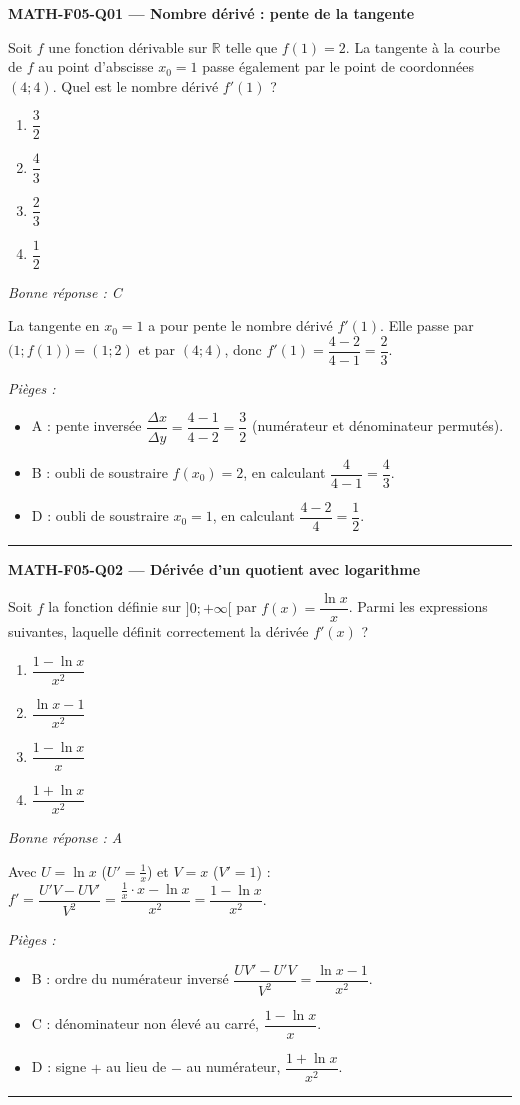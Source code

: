 \documentclass[11pt,a4paper]{article}
\newcommand{\R}{\mathbb{R}}\newcommand{\N}{\mathbb{N}}\newcommand{\Z}{\mathbb{Z}}
\begin{document}
\noindent\textbf{MATH-F05-Q01 --- Nombre dérivé : pente de la tangente}\par
Soit $f$ une fonction dérivable sur $\R$ telle que $f(1)=2$. La tangente à la courbe de $f$ au point d'abscisse $x_0=1$ passe également par le point de coordonnées $(4;4)$. Quel est le nombre dérivé $f'(1)$ ?
\begin{enumerate}[label=\Alph*)]
\item $\dfrac{3}{2}$
\item $\dfrac{4}{3}$
\item $\dfrac{2}{3}$
\item $\dfrac{1}{2}$
\end{enumerate}
\textit{Bonne réponse : C}\par
La tangente en $x_0=1$ a pour pente le nombre dérivé $f'(1)$. Elle passe par $\big(1;f(1)\big)=(1;2)$ et par $(4;4)$, donc $f'(1)=\dfrac{4-2}{4-1}=\dfrac{2}{3}$.\par
\textit{Pièges :}
\begin{itemize}
\item A : pente inversée $\dfrac{\Delta x}{\Delta y}=\dfrac{4-1}{4-2}=\dfrac{3}{2}$ (numérateur et dénominateur permutés).
\item B : oubli de soustraire $f(x_0)=2$, en calculant $\dfrac{4}{4-1}=\dfrac{4}{3}$.
\item D : oubli de soustraire $x_0=1$, en calculant $\dfrac{4-2}{4}=\dfrac{1}{2}$.
\end{itemize}
\vspace{8pt}\hrule\vspace{8pt}

\noindent\textbf{MATH-F05-Q02 --- Dérivée d'un quotient avec logarithme}\par
Soit $f$ la fonction définie sur $]0;+\infty[$ par $f(x)=\dfrac{\ln x}{x}$. Parmi les expressions suivantes, laquelle définit correctement la dérivée $f'(x)$ ?
\begin{enumerate}[label=\Alph*)]
\item $\dfrac{1-\ln x}{x^2}$
\item $\dfrac{\ln x-1}{x^2}$
\item $\dfrac{1-\ln x}{x}$
\item $\dfrac{1+\ln x}{x^2}$
\end{enumerate}
\textit{Bonne réponse : A}\par
Avec $U=\ln x$ ($U'=\tfrac1x$) et $V=x$ ($V'=1$) : $f'=\dfrac{U'V-UV'}{V^2}=\dfrac{\tfrac1x\cdot x-\ln x}{x^2}=\dfrac{1-\ln x}{x^2}$.\par
\textit{Pièges :}
\begin{itemize}
\item B : ordre du numérateur inversé $\dfrac{UV'-U'V}{V^2}=\dfrac{\ln x-1}{x^2}$.
\item C : dénominateur non élevé au carré, $\dfrac{1-\ln x}{x}$.
\item D : signe $+$ au lieu de $-$ au numérateur, $\dfrac{1+\ln x}{x^2}$.
\end{itemize}
\vspace{8pt}\hrule\vspace{8pt}
\end{document}
